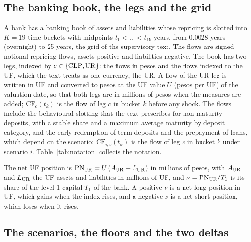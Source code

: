 \subsection{The banking book, the legs and the grid}
\label{sec:problem-book}

A bank has a banking book of assets and liabilities whose repricing is slotted into $K=19$ time buckets with midpoints $t_1<\dots<t_{19}$ years, from 0.0028 years (overnight) to 25 years, the grid of the supervisory text. The flows are signed notional repricing flows, assets positive and liabilities negative. The book has two legs, indexed by $c\in\{\mathrm{CLP},\mathrm{UR}\}$: the flows in pesos and the flows indexed to the UF, which the text treats as one currency, the UR. A flow of the UR leg is written in UF and converted to pesos at the UF value $U$ (pesos per UF) of the valuation date, so that both legs are in millions of pesos when the measures are added; $\mathrm{CF}_{c}(t_k)$ is the flow of leg $c$ in bucket $k$ before any shock. The flows include the behavioural slotting that the text prescribes for non-maturity deposits, with a stable share and a maximum average maturity by deposit category, and the early redemption of term deposits and the prepayment of loans, which depend on the scenario; $\mathrm{CF}_{i,c}(t_k)$ is the flow of leg $c$ in bucket $k$ under scenario $i$. Table~\ref{tab:notation} collects the notation.



The net UF position is $\mathrm{PN}_{\mathrm{UR}}=U\,(A_{\mathrm{UR}}-L_{\mathrm{UR}})$ in millions of pesos, with $A_{\mathrm{UR}}$ and $L_{\mathrm{UR}}$ the UF assets and liabilities in millions of UF, and $\nu=\mathrm{PN}_{\mathrm{UR}}/T_1$ is its share of the level 1 capital $T_1$ of the bank. A positive $\nu$ is a net long position in UF, which gains when the index rises, and a negative $\nu$ is a net short position, which loses when it rises.

\subsection{The scenarios, the floors and the two deltas}
\label{sec:problem-deltas}

